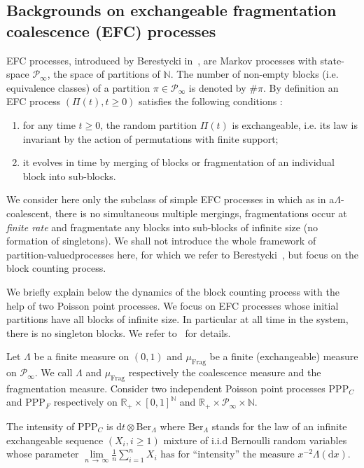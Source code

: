 \documentclass[10pt]{amsart}
\theoremstyle{definition}\newtheorem{defi}[theo]{Definition}\newtheorem{rema}[theo]{Remark}\newtheorem{exam}[theo]{Example}\newtheorem{exem}[theo]{Example}\newtheorem{nota}[theo]{Notation}
\newcommand{\ddr}{\mathrm{d}}
\newcommand{\PPP}{\mathrm{PPP}}
\newcommand{\Frag}{\mathrm{Frag}}
\newcommand{\Ber}{\mathrm{Ber}}
\newcommand{\bbN}{\mathbb{N}}
\newcommand{\bbR}{\mathbb{R}}
\newcommand{\clP}{\mathcal{P}}
\newcommand*{\romanenumi}{\renewcommand*{\theenumi}{\roman{enumi}}}
\begin{document}
\subsection{Backgrounds on exchangeable fragmentation coalescence (EFC) processes}\label{backgroundEFC}


EFC processes, introduced by Berestycki in~\cite{MR2110018}, are Markov processes with state-space $\clP_\infty$, the space of partitions of $\bbN$. The number of non-empty blocks (i.e. equivalence classes) of a partition $\pi\in \clP_\infty$ is denoted by $\#\pi$. By definition an EFC process $(\Pi(t),t\geq 0)$ satisfies the following conditions :
\begin{enumerate}\romanenumi
\item for any time $t\geq 0$, the random partition $\Pi(t)$ is exchangeable, i.e. its law is invariant by the action of permutations with finite support;
\item it evolves in time by merging of blocks or fragmentation of an individual block into sub-blocks.
\end{enumerate}
We consider here only the subclass of simple EFC processes in which as in a\linebreak $\Lambda$-coalescent, there is no simultaneous multiple mergings, fragmentations occur at \emph{finite rate} and fragmentate any blocks into sub-blocks of infinite size (no formation of singletons). We shall not introduce the whole framework of partition-valued\linebreak processes here, for which we refer to Berestycki~\cite{MR2110018}, but focus on the block counting process.

We briefly explain below the dynamics of the block counting process with the help of two Poisson point processes. We focus on EFC processes whose initial partitions have all blocks of infinite size. In particular at all time in the system, there is no singleton blocks. We refer to~\cite[Sections~2.1 and 2.2]{cdiEFC} for details.

Let $\Lambda$ be a finite measure on $(0,1)$ and $\mu_{\Frag}$ be a finite (exchangeable) measure on $\clP_\infty$. We call $\Lambda$ and $\mu_{\Frag}$ respectively the coalescence measure and the fragmentation measure. Consider two independent Poisson point processes $\PPP_C$ and $\PPP_F$ respectively on $\bbR_+\times [0,1]^{\bbN}$ and $\bbR_+\times \clP _\infty\times \bbN$.

The intensity of $\PPP_C$ is $\ddr t\otimes \Ber_{\Lambda}$ where $\Ber_{\Lambda}$ stands for the law of an infinite exchangeable sequence $(X_i,i\geq 1)$ mixture of i.i.d Bernoulli random variables whose parameter $\underset{n\,\rightarrow\,\infty}{\lim}\frac{1}{n}\sum_{i=1}^{n}X_i \text{ has for ``intensity'' the measure } x^{-2}\Lambda(\ddr x).$
\end{document}
